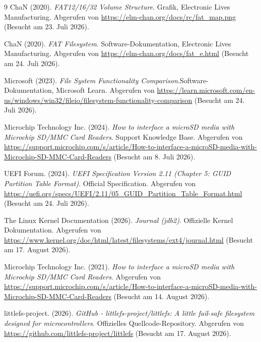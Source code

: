 \begin{thebibliography}{9}
 ChaN (2020).  
\textit{FAT12/16/32 Volume Structure}.
Grafik, Electronic Lives Manufacturing.
Abgerufen von \url{https://elm-chan.org/docs/rc/fat_map.png}  
(Besucht am 23. Juli 2026).

 ChaN (2020).  
\textit{FAT Filesystem}.
Software-Dokumentation, Electronic Lives Manufacturing.
Abgerufen von \url{https://elm-chan.org/docs/fat_e.html}  
(Besucht am 24. Juli 2026).

 Microsoft (2023).  
\textit{File System Functionality Comparison}.Software-Dokumentation, Microsoft Learn.
Abgerufen von \url{https://learn.microsoft.com/en-us/windows/win32/fileio/filesystem-functionality-comparison}
(Besucht am 24. Juli 2026).


 Microchip Technology Inc. (2024). 
\textit{How to interface a microSD media with Microchip SD/MMC Card Readers}. 
Support Knowledge Base. Abgerufen von 
\url{https://support.microchip.com/s/article/How-to-interface-a-microSD-media-with-Microchip-SD-MMC-Card-Readers} 
(Besucht am 8. Juli 2026).

 UEFI Forum. (2024). 
\textit{UEFI Specification Version 2.11 (Chapter 5: GUID Partition Table Format)}. 
Official Specification. 
Abgerufen von \url{https://uefi.org/specs/UEFI/2.11/05_GUID_Partition_Table_Format.html} 
(Besucht am 24. Juli 2026).

 The Linux Kernel Documentation (2026). 
\textit{Journal (jdb2)}. 
Offizielle Kernel Dokumentation. 
Abgerufen von \url{https://www.kernel.org/doc/html/latest/filesystems/ext4/journal.html} 
(Besucht am 17. August 2026).


 Microchip Technology Inc. (2021). 
\textit{How to interface a microSD media with Microchip SD/MMC Card Readers}. 
Abgerufen von \url{https://support.microchip.com/s/article/How-to-interface-a-microSD-media-with-Microchip-SD-MMC-Card-Readers} 
(Besucht am 14. August 2026).

 littlefs-project. (2026).  
\textit{GitHub - littlefs-project/littlefs: A little fail-safe filesystem designed for microcontrollers}.
Offizielles Quellcode-Repository.
Abgerufen von \url{https://github.com/littlefs-project/littlefs}
(Besucht am 17. August 2026).

\end{thebibliography}
